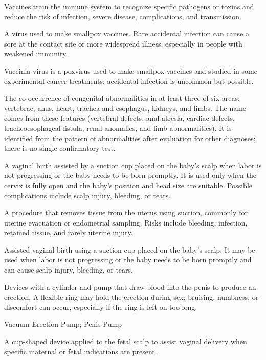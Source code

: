  Vaccines train the immune system to recognize specific pathogens or toxins and reduce the risk of infection, severe disease, complications, and transmission.

 A virus used to make smallpox vaccines. Rare accidental infection can cause a sore at the contact site or more widespread illness, especially in people with weakened immunity.

 Vaccinia virus is a poxvirus used to make smallpox vaccines and studied in some experimental cancer treatments; accidental infection is uncommon but possible.

 The co-occurrence of congenital abnormalities in at least three of six areas: vertebrae, anus, heart, trachea and esophagus, kidneys, and limbs. The name comes from these features (vertebral defects, anal atresia, cardiac defects, tracheoesophageal fistula, renal anomalies, and limb abnormalities). It is identified from the pattern of abnormalities after evaluation for other diagnoses; there is no single confirmatory test.

 A vaginal birth assisted by a suction cup placed on the baby’s scalp when labor is not progressing or the baby needs to be born promptly. It is used only when the cervix is fully open and the baby’s position and head size are suitable. Possible complications include scalp injury, bleeding, or tears.

 A procedure that removes tissue from the uterus using suction, commonly for uterine evacuation or endometrial sampling. Risks include bleeding, infection, retained tissue, and rarely uterine injury.

 Assisted vaginal birth using a suction cup placed on the baby’s scalp. It may be used when labor is not progressing or the baby needs to be born promptly and can cause scalp injury, bleeding, or tears.

 Devices with a cylinder and pump that draw blood into the penis to produce an erection. A flexible ring may hold the erection during sex; bruising, numbness, or discomfort can occur, especially if the ring is left on too long.

\synonyms
Vacuum Erection Pump; Penis Pump

 A cup-shaped device applied to the fetal scalp to assist vaginal delivery when specific maternal or fetal indications are present.

